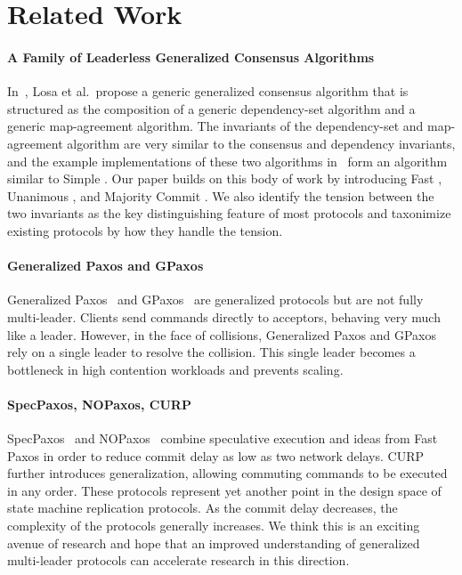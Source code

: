 \section{Related Work}
\newcommand{\condensedparagraph}[1]{\textbf{#1}\;}

\paragraph{A Family of Leaderless Generalized Consensus Algorithms}
In~\cite{losa2016brief}, Losa et al.\ propose a generic generalized consensus
algorithm that is structured as the composition of a generic dependency-set
algorithm and a generic map-agreement algorithm. The invariants of the
dependency-set and map-agreement algorithm are very similar to the consensus
and dependency invariants, and the example implementations of these two
algorithms in~\cite{losa2016brief} form an algorithm similar to Simple
\BPaxos{}. Our paper builds on this body of work by introducing Fast \BPaxos{},
Unanimous \BPaxos{}, and Majority Commit \BPaxos{}. We also identify the
tension between the two invariants as the key distinguishing feature of most
protocols and taxonimize existing protocols by how they handle the tension.

\paragraph{Generalized Paxos and GPaxos}
Generalized Paxos~\cite{lamport2005generalized} and GPaxos~\cite{sutra2011fast}
are generalized protocols but are not fully multi-leader. Clients send commands
directly to acceptors, behaving very much like a leader. However, in the face
of collisions, Generalized Paxos and GPaxos rely on a single leader to resolve
the collision. This single leader becomes a bottleneck in high contention
workloads and prevents scaling.

\paragraph{SpecPaxos, NOPaxos, CURP}
SpecPaxos~\cite{ports2015designing} and NOPaxos~\cite{li2016just} combine
speculative execution and ideas from Fast Paxos in order to reduce commit delay
as low as two network delays. CURP~\cite{park2019exploiting} further introduces
generalization, allowing commuting commands to be executed in any order. These
protocols represent yet another point in the design space of state machine
replication protocols. As the commit delay decreases, the complexity of the
protocols generally increases. We think this is an exciting avenue of research
and hope that an improved understanding of generalized multi-leader protocols
can accelerate research in this direction.

